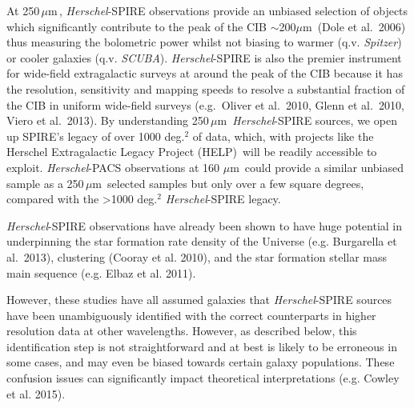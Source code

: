 \documentclass[12pt,a4paper]{article}
\newcommand{\herschel}{{\it Herschel}}
\newcommand{\spitzer}{{\it Spitzer}}
\newcommand{\micron}{$\mu$m}
\begin{document}
At 250\,\micron\,, \herschel-SPIRE observations provide an unbiased selection of objects which significantly contribute to the peak of the CIB $\sim$200\micron\ (Dole et al.\ 2006) thus measuring the bolometric power whilst not biasing to warmer (q.v. \spitzer) or cooler galaxies (q.v. {\it SCUBA}).  \herschel-SPIRE is also the premier instrument for
wide-field extragalactic surveys at around the peak of the CIB because it has the
resolution, sensitivity and mapping speeds to resolve a substantial
fraction of the CIB in
uniform wide-field surveys (e.g.\ Oliver et al.\ 2010, Glenn et al.\
2010, Viero et al.\ 2013). By understanding 250\,\micron\, \herschel-SPIRE sources, we open up SPIRE's legacy of over 1000 deg.$^2$ of data, which, with projects like the Herschel Extragalactic Legacy Project (HELP)\protect\footnotemark \, will be readily accessible to exploit. \herschel-PACS observations at 160 \micron\ could provide a similar unbiased sample as a 250\,\micron\, selected samples but only over a few square degrees, compared with the \textgreater 1000 deg.$^2$ \herschel-SPIRE legacy.

\protect{}

\herschel-SPIRE observations have already been shown to have huge potential in underpinning the star formation rate density of the Universe (e.g. Burgarella et al.\ 2013), clustering (Cooray et al. 2010), and the star formation stellar mass main sequence (e.g. Elbaz et al. 2011). 

However, these studies have all assumed galaxies that \herschel-SPIRE sources have been unambiguously identified with the correct counterparts in higher resolution data at other wavelengths. However, as described below, this identification step is not straightforward and at best is likely to be erroneous in some cases, and may even be biased towards certain galaxy populations. These confusion issues can significantly impact theoretical interpretations (e.g. Cowley et al. 2015).
\end{document}
